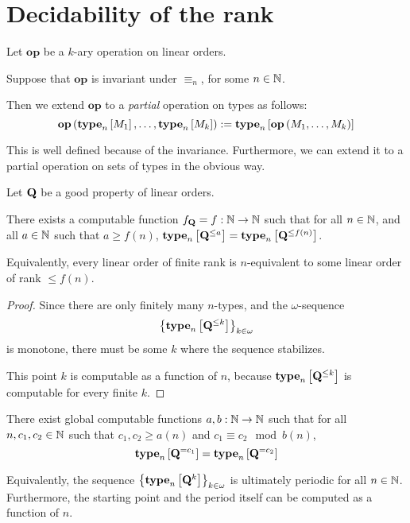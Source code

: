 \section{Decidability of the rank}

\begin{definition}
  Let $\mathbf{op}$ be a $k$-ary operation on linear orders.

  Suppose that $\mathbf{op}$ is invariant under $\equiv_n$, for some $n \in \mathbb{N}$.

  Then we extend $\mathbf{op}$ to a \emph{partial} operation on types as follows:
  \[
    \mathbf{op} \left( {\mathbf{type}_{n} \left[ {M_1} \right], \ldots, \mathbf{type}_{n} \left[ {M_k} \right]} \right)
    := \mathbf{type}_{n} \left[ {\mathbf{op} \left( {M_1, \ldots, M_k} \right)} \right]
  \]

  This is well defined because of the invariance. Furthermore, we can
  extend it to a partial operation on sets of types in the obvious way.
\end{definition}

\begin{lemma}
  Let $\mathbf{Q}$ be a good property of linear orders.

  There exists a computable function $f_{\mathbf{Q}} = f: \mathbb{N} \to \mathbb{N}$ such that
  for all $n \in \mathbb{N}$, and all $a \in \mathbb{N}$ such that $a \ge f(n)$,
  $\mathbf{type}_{n} \left[ {\mathbf{Q}^{\le a}} \right] = \mathbf{type}_{n} \left[ {\mathbf{Q}^{\le f(n)}} \right]$.

  Equivalently, every linear order of finite rank is $n$-equivalent to some linear order of rank $\le f(n)$.
\end{lemma}

\begin{proof}
  Since there are only finitely many $n$-types,
  and the $\omega$-sequence \[\left\{ {\mathbf{type}_{n} \left[ {\mathbf{Q}^{\le k}} \right]} \right\}_{k \in \omega}\]
  is monotone,
  there must be some $k$ where the sequence stabilizes.

  This point $k$ is computable as a function of $n$, because
  $\mathbf{type}_{n} \left[ {\mathbf{Q}^{\le k}} \right]$ is computable for every finite $k$.
\end{proof}

\begin{lemma}
  There exist global computable functions $a, b : \mathbb{N} \to \mathbb{N}$ such that
  for all $n, c_1, c_2 \in \mathbb{N}$ such that $c_1, c_2 \ge a(n)$ and $c_1 \equiv c_2 \mod b(n)$,
  \[\mathbf{type}_{n} \left[ {\mathbf{Q}^{= c_1}} \right] = \mathbf{type}_{n} \left[ {\mathbf{Q}^{= c_2}} \right]\]

  Equivalently, the sequence $\left\{ {\mathbf{type}_{n} \left[ {\mathbf{Q}^{k}} \right]} \right\}_{k \in \omega}$
  is ultimately periodic for all $n \in \mathbb{N}$. Furthermore, the starting point and the period
  itself can be computed as a function of $n$.
\end{lemma}

